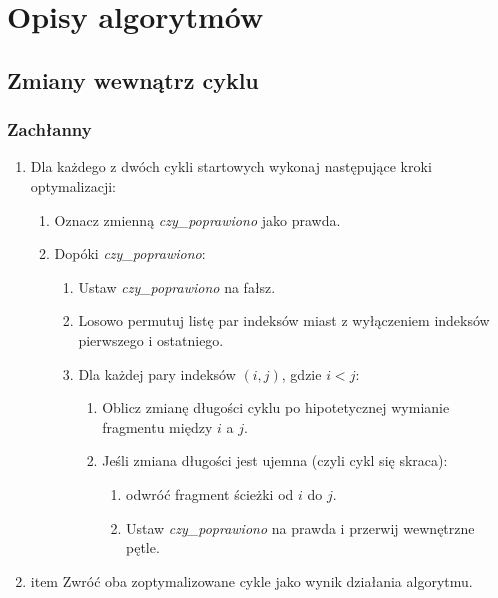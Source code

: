 \documentclass[11pt]{article}
\begin{document}
\section{Opisy algorytmów}\label{sec:opisy-alg}
\subsection{Zmiany wewnątrz cyklu}\label{subsec:zmiany-wewnatrz-cyklu}

\subsubsection{Zachłanny}


\begin{enumerate}
    \item Dla każdego z dwóch cykli startowych wykonaj następujące kroki optymalizacji:
    \begin{enumerate}
        \item Oznacz zmienną \textit{czy\_poprawiono} jako prawda.
        \item Dopóki \textit{czy\_poprawiono}:
        \begin{enumerate}
            \item Ustaw \textit{czy\_poprawiono} na fałsz.
            \item Losowo permutuj listę par indeksów miast z wyłączeniem indeksów pierwszego i ostatniego.
            \item Dla każdej pary indeksów $(i, j)$, gdzie $i < j$:
            \begin{enumerate}
                \item Oblicz zmianę długości cyklu po hipotetycznej wymianie fragmentu między $i$ a $j$.
                \item Jeśli zmiana długości jest ujemna (czyli cykl się skraca):
                \begin{enumerate}
                    \item odwróć fragment ścieżki od $i$ do $j$.
                    \item Ustaw \textit{czy\_poprawiono} na prawda i przerwij wewnętrzne pętle.
                \end{enumerate}
            \end{enumerate}
        \end{enumerate}
    \end{enumerate}
    \item item Zwróć oba zoptymalizowane cykle jako wynik działania algorytmu.
\end{enumerate}
\end{document}
